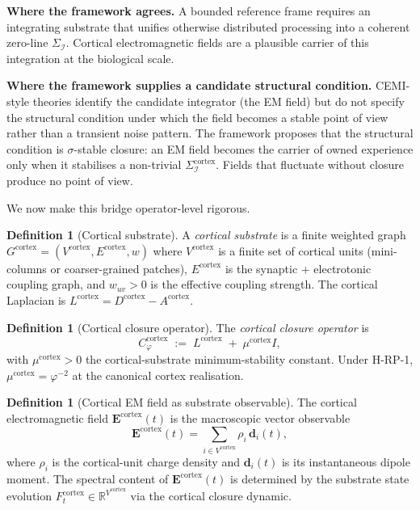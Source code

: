 \documentclass[11pt]{article}
\theoremstyle{plain}
\theoremstyle{definition}
\newtheorem{definition}[theorem]{Definition}
\theoremstyle{remark}
\newcommand{\Ical}{\mathcal{I}}
\newcommand{\Cph}{C_\varphi}
\begin{document}
\textbf{Where the framework agrees.} A bounded reference frame requires an integrating substrate that unifies otherwise distributed processing into a coherent zero-line $\Sigma_\Ical$. Cortical electromagnetic fields are a plausible carrier of this integration at the biological scale.

\textbf{Where the framework supplies a candidate structural condition.} CEMI-style theories identify the candidate integrator (the EM field) but do not specify the structural condition under which the field becomes a stable point of view rather than a transient noise pattern. The framework proposes that the structural condition is $\sigma$-stable closure: an EM field becomes the carrier of owned experience only when it stabilises a non-trivial $\Sigma_\Ical^{\text{cortex}}$. Fields that fluctuate without closure produce no point of view.

We now make this bridge operator-level rigorous.

\begin{definition}[Cortical substrate]\label{def:cortex-substrate}
A \emph{cortical substrate} is a finite weighted graph $G^{\mathrm{cortex}} = (V^{\mathrm{cortex}}, E^{\mathrm{cortex}}, w)$ where $V^{\mathrm{cortex}}$ is a finite set of cortical units (mini-columns or coarser-grained patches), $E^{\mathrm{cortex}}$ is the synaptic + electrotonic coupling graph, and $w_{uv} > 0$ is the effective coupling strength. The cortical Laplacian is $L^{\mathrm{cortex}} = D^{\mathrm{cortex}} - A^{\mathrm{cortex}}$.
\end{definition}

\begin{definition}[Cortical closure operator]\label{def:cph-cortex}
The \emph{cortical closure operator} is
\[
  \Cph^{\mathrm{cortex}} \;:=\; L^{\mathrm{cortex}} \;+\; \mu^{\mathrm{cortex}} I,
\]
with $\mu^{\mathrm{cortex}} > 0$ the cortical-substrate minimum-stability constant. Under H-RP-1, $\mu^{\mathrm{cortex}} = \varphi^{-2}$ at the canonical cortex realisation.
\end{definition}

\begin{definition}[Cortical EM field as substrate observable]\label{def:em-field}
The cortical electromagnetic field $\mathbf{E}^{\mathrm{cortex}}(t)$ is the macroscopic vector observable
\[
  \mathbf{E}^{\mathrm{cortex}}(t) = \sum_{i \in V^{\mathrm{cortex}}} \rho_i \, \mathbf{d}_i(t),
\]
where $\rho_i$ is the cortical-unit charge density and $\mathbf{d}_i(t)$ is its instantaneous dipole moment. The spectral content of $\mathbf{E}^{\mathrm{cortex}}(t)$ is determined by the substrate state evolution $F^{\mathrm{cortex}}_t \in \mathbb{R}^{V^{\mathrm{cortex}}}$ via the cortical closure dynamic.
\end{definition}
\end{document}
